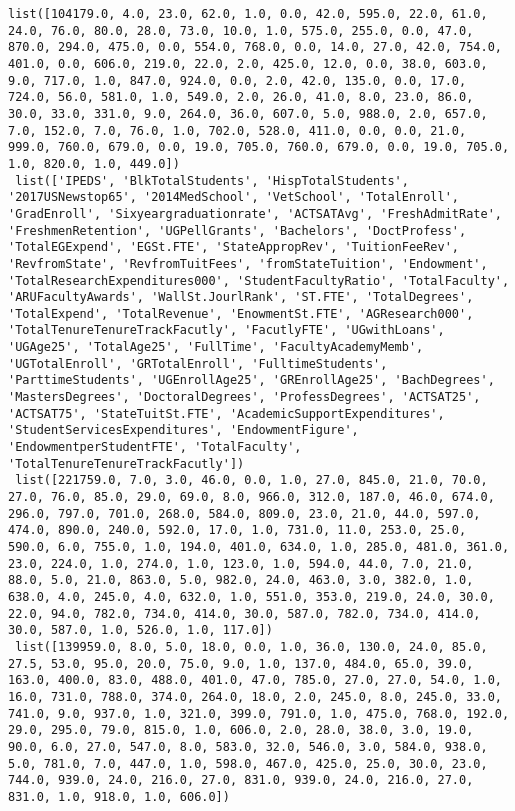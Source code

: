 \documentclass[11pt]{article}
\begin{document}
\begin{Verbatim}[commandchars=\\\{\}]
 list([104179.0, 4.0, 23.0, 62.0, 1.0, 0.0, 42.0, 595.0, 22.0, 61.0, 24.0, 76.0, 80.0, 28.0, 73.0, 10.0, 1.0, 575.0, 255.0, 0.0, 47.0, 870.0, 294.0, 475.0, 0.0, 554.0, 768.0, 0.0, 14.0, 27.0, 42.0, 754.0, 401.0, 0.0, 606.0, 219.0, 22.0, 2.0, 425.0, 12.0, 0.0, 38.0, 603.0, 9.0, 717.0, 1.0, 847.0, 924.0, 0.0, 2.0, 42.0, 135.0, 0.0, 17.0, 724.0, 56.0, 581.0, 1.0, 549.0, 2.0, 26.0, 41.0, 8.0, 23.0, 86.0, 30.0, 33.0, 331.0, 9.0, 264.0, 36.0, 607.0, 5.0, 988.0, 2.0, 657.0, 7.0, 152.0, 7.0, 76.0, 1.0, 702.0, 528.0, 411.0, 0.0, 0.0, 21.0, 999.0, 760.0, 679.0, 0.0, 19.0, 705.0, 760.0, 679.0, 0.0, 19.0, 705.0, 1.0, 820.0, 1.0, 449.0])
 list(['IPEDS', 'BlkTotalStudents', 'HispTotalStudents', '2017USNewstop65', '2014MedSchool', 'VetSchool', 'TotalEnroll', 'GradEnroll', 'Sixyeargraduationrate', 'ACTSATAvg', 'FreshAdmitRate', 'FreshmenRetention', 'UGPellGrants', 'Bachelors', 'DoctProfess', 'TotalEGExpend', 'EGSt.FTE', 'StateAppropRev', 'TuitionFeeRev', 'RevfromState', 'RevfromTuitFees', 'fromStateTuition', 'Endowment', 'TotalResearchExpenditures000', 'StudentFacultyRatio', 'TotalFaculty', 'ARUFacultyAwards', 'WallSt.JourlRank', 'ST.FTE', 'TotalDegrees', 'TotalExpend', 'TotalRevenue', 'EnowmentSt.FTE', 'AGResearch000', 'TotalTenureTenureTrackFacutly', 'FacutlyFTE', 'UGwithLoans', 'UGAge25', 'TotalAge25', 'FullTime', 'FacultyAcademyMemb', 'UGTotalEnroll', 'GRTotalEnroll', 'FulltimeStudents', 'ParttimeStudents', 'UGEnrollAge25', 'GREnrollAge25', 'BachDegrees', 'MastersDegrees', 'DoctoralDegrees', 'ProfessDegrees', 'ACTSAT25', 'ACTSAT75', 'StateTuitSt.FTE', 'AcademicSupportExpenditures', 'StudentServicesExpenditures', 'EndowmentFigure', 'EndowmentperStudentFTE', 'TotalFaculty', 'TotalTenureTenureTrackFacutly'])
 list([221759.0, 7.0, 3.0, 46.0, 0.0, 1.0, 27.0, 845.0, 21.0, 70.0, 27.0, 76.0, 85.0, 29.0, 69.0, 8.0, 966.0, 312.0, 187.0, 46.0, 674.0, 296.0, 797.0, 701.0, 268.0, 584.0, 809.0, 23.0, 21.0, 44.0, 597.0, 474.0, 890.0, 240.0, 592.0, 17.0, 1.0, 731.0, 11.0, 253.0, 25.0, 590.0, 6.0, 755.0, 1.0, 194.0, 401.0, 634.0, 1.0, 285.0, 481.0, 361.0, 23.0, 224.0, 1.0, 274.0, 1.0, 123.0, 1.0, 594.0, 44.0, 7.0, 21.0, 88.0, 5.0, 21.0, 863.0, 5.0, 982.0, 24.0, 463.0, 3.0, 382.0, 1.0, 638.0, 4.0, 245.0, 4.0, 632.0, 1.0, 551.0, 353.0, 219.0, 24.0, 30.0, 22.0, 94.0, 782.0, 734.0, 414.0, 30.0, 587.0, 782.0, 734.0, 414.0, 30.0, 587.0, 1.0, 526.0, 1.0, 117.0])
 list([139959.0, 8.0, 5.0, 18.0, 0.0, 1.0, 36.0, 130.0, 24.0, 85.0, 27.5, 53.0, 95.0, 20.0, 75.0, 9.0, 1.0, 137.0, 484.0, 65.0, 39.0, 163.0, 400.0, 83.0, 488.0, 401.0, 47.0, 785.0, 27.0, 27.0, 54.0, 1.0, 16.0, 731.0, 788.0, 374.0, 264.0, 18.0, 2.0, 245.0, 8.0, 245.0, 33.0, 741.0, 9.0, 937.0, 1.0, 321.0, 399.0, 791.0, 1.0, 475.0, 768.0, 192.0, 29.0, 295.0, 79.0, 815.0, 1.0, 606.0, 2.0, 28.0, 38.0, 3.0, 19.0, 90.0, 6.0, 27.0, 547.0, 8.0, 583.0, 32.0, 546.0, 3.0, 584.0, 938.0, 5.0, 781.0, 7.0, 447.0, 1.0, 598.0, 467.0, 425.0, 25.0, 30.0, 23.0, 744.0, 939.0, 24.0, 216.0, 27.0, 831.0, 939.0, 24.0, 216.0, 27.0, 831.0, 1.0, 918.0, 1.0, 606.0])

\end{Verbatim}
\end{document}
